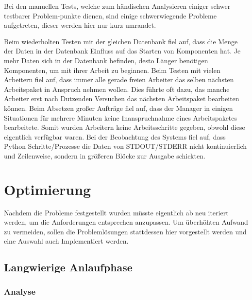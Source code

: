 Bei den manuellen Tests, welche zum händischen Analysieren
einiger schwer testbarer Problem-punkte dienen,
sind einige schwerwiegende Probleme aufgetreten,
dieser werden hier nur kurz umrandet.

\begin{description}
        Beim wiederholten Testen mit der gleichen Datenbank fiel auf, dass die Menge der Daten in der Datenbank Einfluss auf das Starten von Komponenten hat. Je mehr Daten sich in der Datenbank befinden, desto Länger benötigen Komponenten, um mit ihrer Arbeit zu beginnen.
        Beim Testen mit vielen Arbeitern fiel auf, dass immer alle gerade freien Arbeiter das selben nächsten Arbeitspaket in Anspruch nehmen wollen. Dies führte oft dazu, das manche Arbeiter erst nach Dutzenden Versuchen das nächsten Arbeitspaket bearbeiten können.
        Beim Absetzen großer Aufträge fiel auf, dass der Manager in einigen Situationen für mehrere Minuten keine Inanspruchnahme eines Arbeitspaketes bearbeitete. Somit wurden Arbeitern keine Arbeitsschritte gegeben, obwohl diese eigentlich verfügbar waren.
        Bei der Beobachtung des Systems fiel auf, dass Python Schritte/Prozesse
        die Daten von STDOUT/STDERR nicht kontinuierlich und Zeilenweise,
        sondern in größeren Blöcke zur Ausgabe schickten.
\end{description}

\chapter{Optimierung}

Nachdem die Probleme festgestellt wurden
müsste eigentlich ab  neu iteriert werden,
um die Anforderungen entsprechen anzupassen.
Um überhöhten Aufwand zu vermeiden,
sollen die Problemlösungen stattdessen hier vorgestellt werden
und eine Auswahl auch Implementiert werden.

\section{Langwierige Anlaufphase}

\subsection{Analyse}

